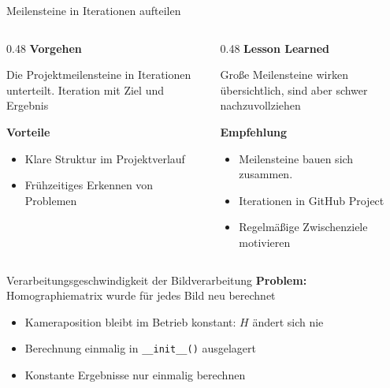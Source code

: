 \documentclass[aspectratio=169]{beamer}
\begin{document}
	\begin{frame}{Meilensteine in Iterationen aufteilen}
		\begin{columns}
        \begin{column}{0.48\textwidth}
            \textbf{Vorgehen}

            Die Projektmeilensteine in Iterationen unterteilt.
            Iteration mit Ziel und Ergebnis
            \vspace{0.5em}

            \textbf{Vorteile}
            \begin{itemize}
                \item Klare Struktur im Projektverlauf
                \item Frühzeitiges Erkennen von Problemen
            \end{itemize}
        \end{column}
        \begin{column}{0.48\textwidth}
            \textbf{Lesson Learned}
            \vspace{0.3em}

            Große Meilensteine wirken übersichtlich, sind aber schwer nachzuvollziehen
            \vspace{0.5em}

            \textbf{Empfehlung}
            \begin{itemize}
                \item Meilensteine bauen sich zusammen.
                \item Iterationen in GitHub Project 
                \item Regelmäßige Zwischenziele motivieren
            \end{itemize}
        \end{column}
    \end{columns}
		
	\end{frame}

	\begin{frame}{Verarbeitungsgeschwindigkeit der Bildverarbeitung}	%
	\textbf{Problem:} Homographiematrix wurde für jedes Bild neu berechnet

	\vspace{1em}
	\begin{itemize}
	    \item Kameraposition bleibt im Betrieb konstant: $H$ ändert sich nie
	    \item[$\Rightarrow$] Berechnung einmalig in \texttt{\_\_init\_\_()} ausgelagert
	    \item[$\Rightarrow$] Konstante Ergebnisse nur einmalig berechnen
	\end{itemize}
	\end{frame}
\end{document}
